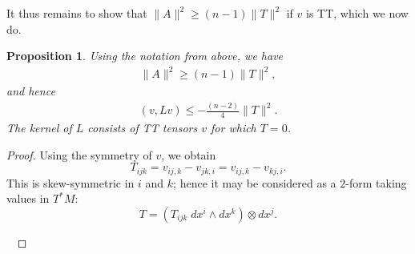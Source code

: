 \documentclass[10pt,reqno]{amsart}
\newtheorem{prop}[theorem]{Proposition}
\begin{document}
It thus remains to show that $\|A\|^2 \geq (n-1) \|T\|^2$ if $v$ is TT, which we now do.
\begin{prop} \label{prop:spec-est-TT}
Using the notation from above, we have 
\begin{align*} \|A\|^2 \geq (n-1) \|T\|^2,
\end{align*}
and hence 
\begin{align} \label{eqn:lvv}
(v, Lv) \leq - \frac{(n-2)}{4} \| T \|^2.
\end{align}
The kernel of $L$ consists of TT tensors $v$ for which $T = 0$.
\end{prop}
\begin{proof}
Using the symmetry of $v$, we obtain
\[ 
T_{ijk} =  v_{ij,k} - v_{jk,i} = v_{ij,k} - v_{kj,i}.
\]
This is skew-symmetric in $i$ and $k$; hence it may be considered as a $2$-form taking values in $T^* M$:
\[ 
T = ( T_{ijk} \; dx^i \wedge dx^k) \otimes dx^j. 
\]

\


\end{proof}
\end{document}
